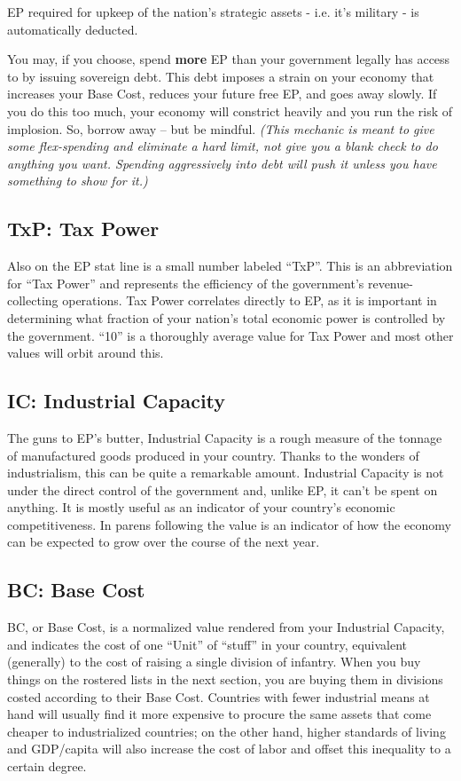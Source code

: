 \documentclass[11 pt]{scrartcl}
\begin{document}
EP required for upkeep of the nation's strategic assets - i.e. it's military - is automatically deducted.

You may, if you choose, spend \textbf{more} EP than your government legally has access to by issuing sovereign debt. This debt imposes a strain on your economy that increases your Base Cost, reduces your future free EP, and goes away slowly. If you do this too much, your economy will constrict heavily and you run the risk of implosion. So, borrow away -- but be mindful. \textit{(This mechanic is meant to give some flex-spending and eliminate a hard limit, not give you a blank check to do anything you want. Spending aggressively into debt will push it unless you have something to show for it.)}

\subsection{TxP: Tax Power}

Also on the EP stat line is a small number labeled ``TxP''. This is an abbreviation for ``Tax Power'' and represents the efficiency of the government's revenue-collecting operations. Tax Power correlates directly to EP, as it is important in determining what fraction of your nation's total economic power is controlled by the government. ``10'' is a thoroughly average value for Tax Power and most other values will orbit around this.

\subsection{IC: Industrial Capacity}

The guns to EP's butter, Industrial Capacity is a rough measure of the tonnage of manufactured goods produced in your country. Thanks to the wonders of industrialism, this can be quite a remarkable amount. Industrial Capacity is not under the direct control of the government and, unlike EP, it can't be spent on anything. It is mostly useful as an indicator of your country's economic competitiveness. In parens following the value is an indicator of how the economy can be expected to grow over the course of the next year.

\subsection{BC: Base Cost}

BC, or Base Cost, is a normalized value rendered from your Industrial Capacity, and indicates the cost of one ``Unit'' of ``stuff'' in your country, equivalent (generally) to the cost of raising a single division of infantry. When you buy things on the rostered lists in the next section, you are buying them in divisions costed according to their Base Cost. Countries with fewer industrial means at hand will usually find it more expensive to procure the same assets that come cheaper to industrialized countries; on the other hand, higher standards of living and GDP/capita will also increase the cost of labor and offset this inequality to a certain degree.
\end{document}
